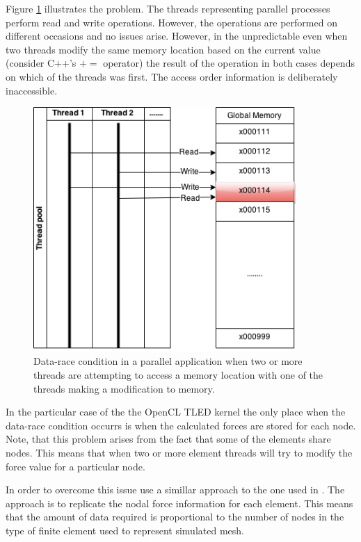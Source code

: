  Figure \ref{gpu-data-race} illustrates the problem. The threads representing parallel processes perform read and write operations. However, the operations are performed on different occasions and no issues arise. However, in the unpredictable even when two threads modify the same memory location based on the current value (consider C++'s $+=$ operator) the result of the operation in both cases depends on which of the threads was first. The access order information is deliberately inaccessible.

  \begin{figure}
    \centering
      \includegraphics[width=100mm]{sections/methodology/images/gpu/data-race.png}
    \caption{\label{gpu-data-race} Data-race condition in a parallel application when two or more threads are attempting to access a memory location with one of the threads making a modification to memory.}
  \end{figure}

  In the particular case of the the OpenCL TLED kernel the only place when the data-race condition occurrs is when the calculated forces are stored for each node. Note, that this problem arises from the fact that some of the elements share nodes. This means that when two or more element threads will try to modify the force value for a particular node.

  In order to overcome this issue use a simillar approach to the one used in \cite{Johnsen2014}. The approach is to replicate the nodal force information for each element. This means that the amount of data required is proportional to the number of nodes in the type of finite element used to represent simulated mesh.

